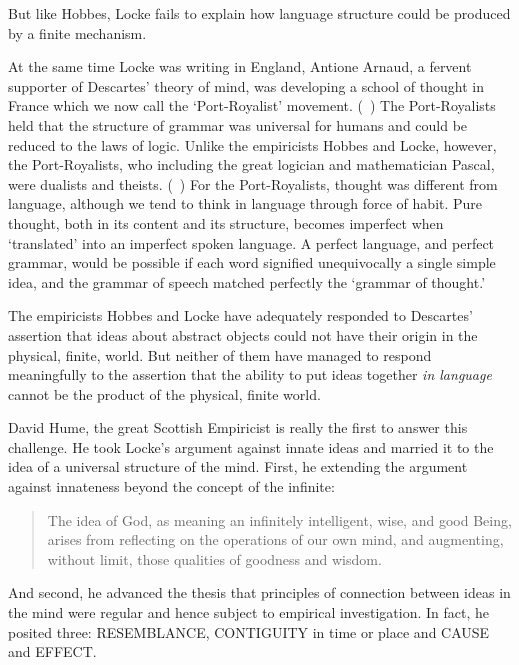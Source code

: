 \begin{refsection}
But like Hobbes, Locke fails to explain how language structure could be produced by a finite mechanism.

At the same time Locke was writing in England, Antione Arnaud, a fervent supporter of Descartes' theory of mind, was developing a school of thought in France which we now call the `Port-Royalist' movement. (~\citep{Carr:1996uw}) The Port-Royalists held that the structure of grammar was universal for humans and could be reduced to the laws of logic. Unlike the empiricists Hobbes and Locke, however, the Port-Royalists, who including the great logician and mathematician Pascal, were dualists and theists. (~\citep{Clark1903}) For the Port-Royalists, thought was different from language, although we tend to think in language through force of habit. Pure thought, both in its content and its structure, becomes imperfect when `translated' into an imperfect spoken language. A perfect language, and perfect grammar, would be possible if each word signified unequivocally a single simple idea, and the grammar of speech matched perfectly the `grammar of thought.' 

The empiricists Hobbes and Locke have adequately responded to Descartes’ assertion that ideas about abstract objects could not have their origin in the physical, finite, world. But neither of them have managed to respond meaningfully to the assertion that the ability to put ideas together \emph{in language} cannot be the product of the physical, finite world.

David Hume, the great Scottish Empiricist is really the first to answer this challenge. He took Locke’s argument against innate ideas and married it to the idea of a universal structure of the mind. First, he extending the argument against innateness beyond the concept of the infinite:

\begin{quote}

The idea of God, as meaning an infinitely intelligent, wise, and good Being, arises from reflecting on the operations of our own mind, and augmenting, without limit, those qualities of goodness and wisdom. ~\citep[\S 2, p. 14]{Hume:IGMvPNU2}
\end{quote}

And second, he advanced the thesis that principles of connection between ideas in the mind were regular and hence subject to empirical investigation. In fact, he posited three: RESEMBLANCE, CONTIGUITY in time or place and CAUSE and EFFECT. ~\citep[Part 1, \S  IV]{Hume:IGMvPNU2}


\end{refsection}
